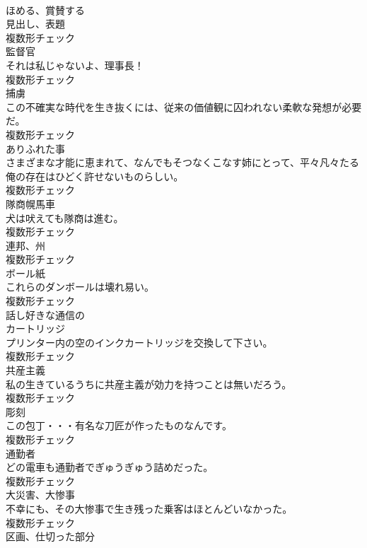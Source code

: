 \documentclass[8pt]{extreport}
\begin{document}
\begin{CJK}{UTF8}{min}
\\	[動詞]	ほめる、賞賛する	
\\	[名詞]	見出し、表題	
\\	複数形チェック
\\	[名詞]	監督官	
\\	それは私じゃないよ、理事長！	
\\	複数形チェック
\\	[名詞]	捕虜	
\\	この不確実な時代を生き抜くには、従来の価値観に囚われない柔軟な発想が必要だ。	
\\	複数形チェック
\\	[名詞]	ありふれた事	
\\	さまざまな才能に恵まれて、なんでもそつなくこなす姉にとって、平々凡々たる俺の存在はひどく許せないものらしい。	
\\	複数形チェック
\\	[名詞]	隊商幌馬車	
\\	犬は吠えても隊商は進む。	
\\	複数形チェック
\\	[名詞]	連邦、州	
\\	複数形チェック
\\	[名詞]	ボール紙	
\\	これらのダンボールは壊れ易い。	
\\	複数形チェック
\\	[形容詞]	話し好きな通信の	
\\	[名詞]	カートリッジ	
\\	プリンター内の空のインクカートリッジを交換して下さい。	
\\	複数形チェック
\\	[名詞]	共産主義	
\\	私の生きているうちに共産主義が効力を持つことは無いだろう。	
\\	複数形チェック
\\	[名詞]	彫刻	
\\	この包丁・・・有名な刀匠が作ったものなんです。	
\\	複数形チェック
\\	[名詞]	通勤者	
\\	どの電車も通勤者でぎゅうぎゅう詰めだった。	
\\	複数形チェック
\\	[名詞]	大災害、大惨事	
\\	不幸にも、その大惨事で生き残った乗客はほとんどいなかった。	
\\	複数形チェック
\\	[名詞]	区画、仕切った部分	

\end{CJK}
\end{document}
